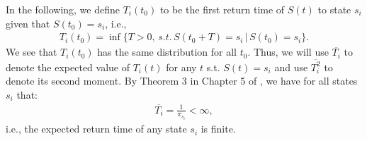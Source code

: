\documentclass[journal]{IEEEtran}
\begin{document}
In the following, we define $T_{i}(t_0)$ to be the first return time of $S(t)$ to state $s_i$ given that $S(t_0)=s_i$, i.e., 
\begin{eqnarray*}
T_{i}(t_0)=\inf\{T>0, \,s.t.\, S(t_0+T)=s_i\, |\, S(t_0)=s_i\}.
\end{eqnarray*} 
We see that $T_{i}(t_0)$ has the same distribution for all $t_0$. Thus, we will use $\overline{T_{i}}$ to denote the expected value of $T_{i}(t)$ for any $t$ s.t. $S(t)=s_i$ and use $\overline{T^2_{i}}$ to denote its second moment. 
By Theorem 3 in Chapter 5 of \cite{gallager_stochastic}, we have for all states $s_i$ that:
\begin{eqnarray}
\overline{T_{i}} =\frac{1}{\pi_{s_i}}<\infty, \label{eq:exp-time-prob}
\end{eqnarray}
i.e., the expected return time of any state $s_i$ is finite. 
\end{document}
